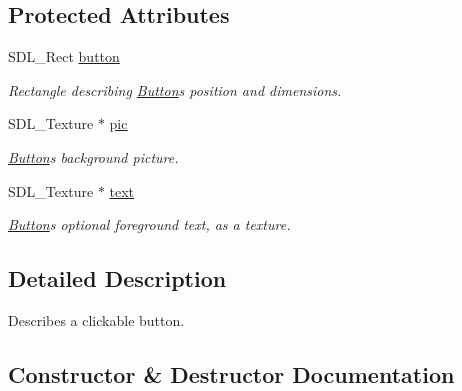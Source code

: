 \subsection*{Protected Attributes}
\begin{DoxyCompactItemize}
\item 
S\+D\+L\+\_\+\+Rect \hyperlink{class_button_aa552275b84734a66578ab684e51ab64a}{button}\hypertarget{class_button_aa552275b84734a66578ab684e51ab64a}{}\label{class_button_aa552275b84734a66578ab684e51ab64a}

\begin{DoxyCompactList}\small\item\em Rectangle describing \hyperlink{class_button}{Button}\textquotesingle{}s position and dimensions. \end{DoxyCompactList}\item 
S\+D\+L\+\_\+\+Texture $\ast$ \hyperlink{class_button_adf19f779ff118533b103aedcf743b8bf}{pic}\hypertarget{class_button_adf19f779ff118533b103aedcf743b8bf}{}\label{class_button_adf19f779ff118533b103aedcf743b8bf}

\begin{DoxyCompactList}\small\item\em \hyperlink{class_button}{Button}\textquotesingle{}s background picture. \end{DoxyCompactList}\item 
S\+D\+L\+\_\+\+Texture $\ast$ \hyperlink{class_button_a08d8969454e7a566717d2488a788bd78}{text}\hypertarget{class_button_a08d8969454e7a566717d2488a788bd78}{}\label{class_button_a08d8969454e7a566717d2488a788bd78}

\begin{DoxyCompactList}\small\item\em \hyperlink{class_button}{Button}\textquotesingle{}s optional foreground text, as a texture. \end{DoxyCompactList}\end{DoxyCompactItemize}


\subsection{Detailed Description}
Describes a clickable button. 

\subsection{Constructor \& Destructor Documentation}
